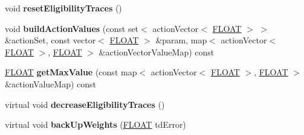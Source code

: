 \begin{DoxyCompactItemize}
\item 
\hypertarget{classAI_1_1Algorithm_1_1GradientDescent_a2ce6e2bbfc5b4d821d02f454c0e3c8c5}{void {\bfseries reset\-Eligibility\-Traces} ()}\label{classAI_1_1Algorithm_1_1GradientDescent_a2ce6e2bbfc5b4d821d02f454c0e3c8c5}

\item 
\hypertarget{classAI_1_1Algorithm_1_1GradientDescent_a7f58c9d3f1c760d5e4d1f9546abb1bec}{void {\bfseries build\-Action\-Values} (const set$<$ action\-Vector$<$ \hyperlink{namespaceAI_a41b74884a20833db653dded3918e05c3}{F\-L\-O\-A\-T} $>$ $>$ \&action\-Set, const vector$<$ \hyperlink{namespaceAI_a41b74884a20833db653dded3918e05c3}{F\-L\-O\-A\-T} $>$ \&param, map$<$ action\-Vector$<$ \hyperlink{namespaceAI_a41b74884a20833db653dded3918e05c3}{F\-L\-O\-A\-T} $>$, \hyperlink{namespaceAI_a41b74884a20833db653dded3918e05c3}{F\-L\-O\-A\-T} $>$ \&action\-Vector\-Value\-Map) const }\label{classAI_1_1Algorithm_1_1GradientDescent_a7f58c9d3f1c760d5e4d1f9546abb1bec}

\item 
\hypertarget{classAI_1_1Algorithm_1_1GradientDescent_a651b2804acf14aaebdf461d39cd970eb}{\hyperlink{namespaceAI_a41b74884a20833db653dded3918e05c3}{F\-L\-O\-A\-T} {\bfseries get\-Max\-Value} (const map$<$ action\-Vector$<$ \hyperlink{namespaceAI_a41b74884a20833db653dded3918e05c3}{F\-L\-O\-A\-T} $>$, \hyperlink{namespaceAI_a41b74884a20833db653dded3918e05c3}{F\-L\-O\-A\-T} $>$ \&action\-Value\-Map) const }\label{classAI_1_1Algorithm_1_1GradientDescent_a651b2804acf14aaebdf461d39cd970eb}

\item 
\hypertarget{classAI_1_1Algorithm_1_1GradientDescent_a5c5ae472417bc016fdd185875614359d}{virtual void {\bfseries decrease\-Eligibility\-Traces} ()}\label{classAI_1_1Algorithm_1_1GradientDescent_a5c5ae472417bc016fdd185875614359d}

\item 
\hypertarget{classAI_1_1Algorithm_1_1GradientDescent_a49b556716f8ca93c088b10f4432a3688}{virtual void {\bfseries back\-Up\-Weights} (\hyperlink{namespaceAI_a41b74884a20833db653dded3918e05c3}{F\-L\-O\-A\-T} td\-Error)}\label{classAI_1_1Algorithm_1_1GradientDescent_a49b556716f8ca93c088b10f4432a3688}

\end{DoxyCompactItemize}
